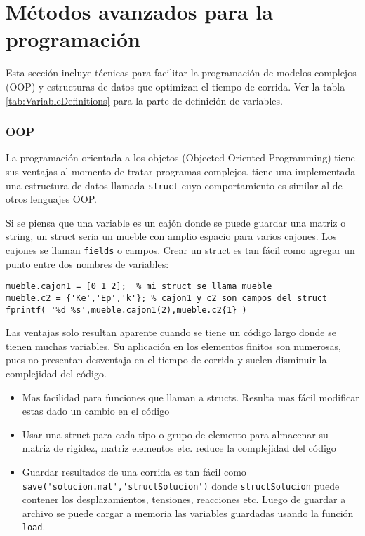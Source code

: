 
\part{Métodos avanzados para la programación}
Esta sección incluye técnicas para facilitar la programación de modelos complejos (OOP) y estructuras de datos que optimizan el tiempo de corrida. Ver la tabla \ref{tab:VariableDefinitions} para la parte de definición de variables.

\section{OOP}
La programación orientada a los objetos (Objected Oriented Programming) tiene sus ventajas al momento de tratar programas complejos. \Matlab{} tiene una implementada una estructura de datos llamada \verb|struct| cuyo comportamiento es similar al de otros lenguajes OOP. 

Si se piensa que una variable es un cajón donde se puede guardar una matriz o string, un struct seria un mueble con amplio espacio para varios cajones. Los cajones se llaman \verb|fields| o campos. Crear un struct es tan fácil como agregar un punto entre dos nombres de variables:

\begin{lstlisting}[caption={Ejemplos de structs y como acceder a sus campos.}]
mueble.cajon1 = [0 1 2];  % mi struct se llama mueble
mueble.c2 = {'Ke','Ep','k'}; % cajon1 y c2 son campos del struct 
fprintf( '%d %s',mueble.cajon1(2),mueble.c2{1} )
\end{lstlisting}

Las ventajas solo resultan aparente cuando se tiene un código largo donde se tienen muchas variables. Su aplicación en los elementos finitos son numerosas, pues no presentan desventaja en el tiempo de corrida y suelen disminuir la complejidad del código.

\begin{itemize}
	\item Mas facilidad para funciones que llaman a structs. Resulta mas fácil modificar estas dado un cambio en el código
	\item Usar una struct para cada tipo o grupo de elemento para almacenar su matriz de rigidez, matriz elementos etc. reduce la complejidad del código
	\item Guardar resultados de una corrida es tan fácil como \verb|save('solucion.mat','structSolucion')| donde \verb|structSolucion| puede contener los desplazamientos, tensiones, reacciones etc. Luego de guardar a archivo se puede cargar a memoria las variables guardadas usando la función \verb|load|.
\end{itemize}



